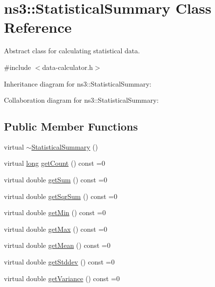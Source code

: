 \hypertarget{classns3_1_1StatisticalSummary}{}\section{ns3\+:\+:Statistical\+Summary Class Reference}
\label{classns3_1_1StatisticalSummary}


Abstract class for calculating statistical data.  




{\ttfamily \#include $<$data-\/calculator.\+h$>$}



Inheritance diagram for ns3\+:\+:Statistical\+Summary\+:


Collaboration diagram for ns3\+:\+:Statistical\+Summary\+:
\subsection*{Public Member Functions}
\begin{DoxyCompactItemize}
\item 
virtual \hyperlink{classns3_1_1StatisticalSummary_a63fcdbb4ea573f10a151ae102ec958c4}{$\sim$\+Statistical\+Summary} ()
\item 
virtual \hyperlink{generate__test__data__lte__sinr_8m_a0eab6be67e93c3411f7a8b53cc297285}{long} \hyperlink{classns3_1_1StatisticalSummary_a8eb8595f7ee683a643103a8c7ceb4aaf}{get\+Count} () const =0
\item 
virtual double \hyperlink{classns3_1_1StatisticalSummary_aa0985cd61bb66fe79f81ea47f6dc1ed7}{get\+Sum} () const =0
\item 
virtual double \hyperlink{classns3_1_1StatisticalSummary_aa596f679778e8f664ca176c570ef13ec}{get\+Sqr\+Sum} () const =0
\item 
virtual double \hyperlink{classns3_1_1StatisticalSummary_a901103a16ae2c7967fe6b6156133d454}{get\+Min} () const =0
\item 
virtual double \hyperlink{classns3_1_1StatisticalSummary_a2f6f87e1719bce70ead2c7dead06542a}{get\+Max} () const =0
\item 
virtual double \hyperlink{classns3_1_1StatisticalSummary_a38faea03f04063e6d2dba79915d74f85}{get\+Mean} () const =0
\item 
virtual double \hyperlink{classns3_1_1StatisticalSummary_a5b9acc83876f85a7c35c4943ad43187a}{get\+Stddev} () const =0
\item 
virtual double \hyperlink{classns3_1_1StatisticalSummary_a69926c2885f04c9d437b59d7cc9337a9}{get\+Variance} () const =0
\end{DoxyCompactItemize}


